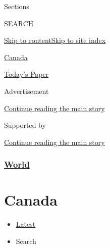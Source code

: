Sections

SEARCH

\protect\hyperlink{site-content}{Skip to
content}\protect\hyperlink{site-index}{Skip to site index}

\href{https://www.nytimes.com/section/world/canada}{Canada}

\href{https://myaccount.nytimes.com/auth/login?response_type=cookie\&client_id=vi}{}

\href{https://www.nytimes.com/section/todayspaper}{Today's Paper}

Advertisement

\protect\hyperlink{after-top}{Continue reading the main story}

Supported by

\protect\hyperlink{after-sponsor}{Continue reading the main story}

\hypertarget{world}{%
\subsubsection{\texorpdfstring{\href{/section/world}{World}}{World}}\label{world}}

\hypertarget{canada}{%
\section{Canada}\label{canada}}

\begin{itemize}
\tightlist
\item
  \protect\hyperlink{stream-panel}{Latest}
\item
  Search
\end{itemize}

